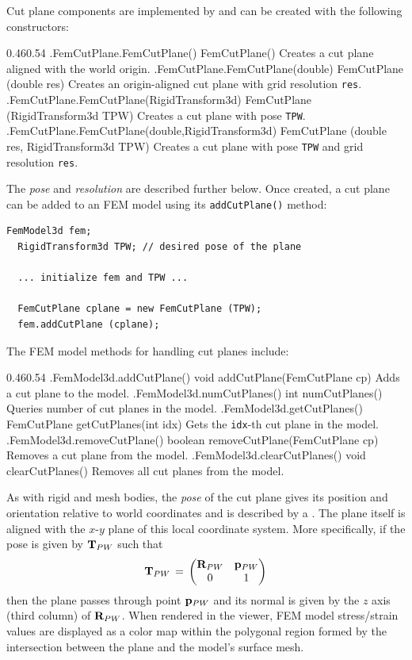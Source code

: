 Cut plane components are implemented by
 and can be created
with the following constructors:
%
\begin{methodtable}{0.46}{0.54}
\midline
%
\methodentry
{\fem.FemCutPlane.FemCutPlane()}
{FemCutPlane()}%
{Creates a cut plane aligned with the world origin.}%
%
\methodentry
{\fem.FemCutPlane.FemCutPlane(double)}
{FemCutPlane (double res)}%
{Creates an origin-aligned cut plane with grid resolution {\tt res}.}%
%
\methodentry
{\fem.FemCutPlane.FemCutPlane(RigidTransform3d)}
{FemCutPlane (RigidTransform3d TPW)}%
{Creates a cut plane with pose {\tt TPW}.}%
%
\methodentry
{\fem.FemCutPlane.FemCutPlane(double,RigidTransform3d)}
{FemCutPlane (double res, RigidTransform3d TPW)}%
{Creates a cut plane with pose {\tt TPW} and grid resolution {\tt res}.}%
%
\midline
\end{methodtable}
%
The {\it pose} and {\it resolution} are described further below.  Once
created, a cut plane can be added to an FEM model using its
{\tt addCutPlane()} method:
%
\begin{lstlisting}[]
  FemModel3d fem;
  RigidTransform3d TPW; // desired pose of the plane

  ... initialize fem and TPW ...

  FemCutPlane cplane = new FemCutPlane (TPW);
  fem.addCutPlane (cplane);
\end{lstlisting}
%
The FEM model methods for handling cut planes include:
%
\begin{methodtable}{0.46}{0.54}
\midline
%
\methodentry
{\fem.FemModel3d.addCutPlane()}
{void addCutPlane(FemCutPlane cp)}%
{Adds a cut plane to the model.}%
%
\methodentry
{\fem.FemModel3d.numCutPlanes()}
{int numCutPlanes()}%
{Queries number of cut planes in the model.}%
%
\methodentry
{\fem.FemModel3d.getCutPlanes()}
{FemCutPlane getCutPlanes(int idx)}%
{Gets the {\tt idx}-th cut plane in the model.}%
%
\methodentry
{\fem.FemModel3d.removeCutPlane()}
{boolean removeCutPlane(FemCutPlane cp)}%
{Removes a cut plane from the model.}%
%
\methodentry
{\fem.FemModel3d.clearCutPlanes()}
{void clearCutPlanes()}%
{Removes all cut planes from the model.}%
\midline
\end{methodtable}
%
As with rigid and mesh bodies, the {\it pose} of the cut plane gives
its position and orientation relative to world coordinates and is
described by a .  The
plane itself is aligned with the $x$-$y$ plane of this local coordinate
system. More specifically, if the pose is given by ${\bf T}_{PW}$ such that
%
\begin{equation}
{\bf T}_{PW} \, = \,
\left(\begin{matrix} {\bf R}_{PW} & {\bf p}_{PW} \\ 0 & 1 \end{matrix}\right)
\end{equation}
%
then the plane passes through point ${\bf p}_{PW}$ and its normal is given
by the $z$ axis (third column) of ${\bf R}_{PW}$.  When rendered in the
viewer, FEM model stress/strain values are displayed as a color map
within the polygonal region formed by the intersection between the
plane and the model's surface mesh. 


